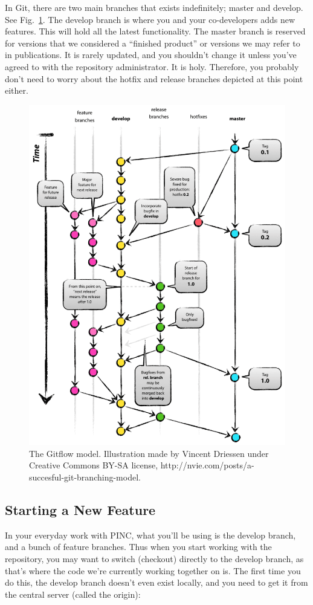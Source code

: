 \documentclass[10pt,a4paper]{article}
\newcommand{\reffig}[1]{Fig.~\ref{fig:#1}}
\begin{document}
In Git, there are two main branches that exists indefinitely; master and develop. See \reffig{gitflow}. The develop branch is where you and your co-developers adds new features. This will hold all the latest functionality. The master branch is reserved for versions that we considered a ``finished product'' or versions we may refer to in publications. It is rarely updated, and you shouldn't change it unless you've agreed to with the repository administrator. It is holy. Therefore, you probably don't need to worry about the hotfix and release branches depicted at this point either.
\begin{figure}
	\centering
	\includegraphics[width=\textwidth]{git-model.png}
	\caption{The Gitflow model. Illustration made by Vincent Driessen under Creative Commons BY-SA license, http://nvie.com/posts/a-succesful-git-branching-model.}
	\label{fig:gitflow}
\end{figure}

\subsection{Starting a New Feature}
In your everyday work with PINC, what you'll be using is the develop branch, and a bunch of feature branches. Thus when you start working with the repository, you may want to switch (checkout) directly to the develop branch, as that's where the code we're currently working together on is. The first time you do this, the develop branch doesn't even exist locally, and you need to get it from the central server (called the origin):
\end{document}
